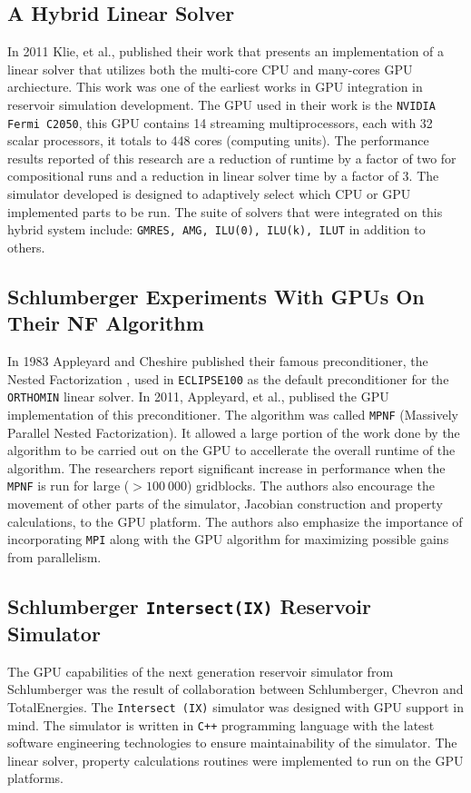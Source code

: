 \documentclass[barcolor=BrickRed,nocopyright,nolists]{asmejour}
\begin{document}
\subsection{A Hybrid Linear Solver}
In 2011 Klie, et al.\cite{spe141265}, published their work that presents an implementation of a linear solver that utilizes both the multi-core CPU and many-cores GPU archiecture. This work was one of the earliest works in GPU integration in reservoir simulation development. The GPU used in their work is the \texttt{NVIDIA Fermi C2050}, this GPU contains
14 streaming multiprocessors, each with 32 scalar processors, it totals to 448 cores (computing units). The performance results reported of this research are a reduction of runtime by a factor of two for compositional runs and a reduction in linear solver time by a factor of 3. The simulator developed is designed to adaptively select which CPU or GPU implemented
parts to be run. The suite of solvers that were integrated on this hybrid system include: \texttt{GMRES, AMG, ILU(0), ILU(k), ILUT} in addition to others.

\subsection{Schlumberger Experiments With GPUs On Their NF Algorithm}
In 1983 Appleyard and Cheshire\cite{spe12264} published their famous preconditioner, the Nested Factorization , used in \texttt{ECLIPSE100} as the default preconditioner for the \texttt{ORTHOMIN} linear solver. In 2011, Appleyard, et al., publised the GPU implementation of this preconditioner\cite{spe141402}. The algorithm was called 
\texttt{MPNF} (Massively Parallel Nested Factorization). It allowed a large portion of the work done by the algorithm to be carried out on the GPU to accellerate the overall runtime of the algorithm. The researchers report significant increase in performance when the \texttt{MPNF} is run for large ($>100 \ 000$) gridblocks. The authors
also encourage the movement of other parts of the simulator, Jacobian construction and property calculations, to the GPU platform. The authors also emphasize the importance of incorporating \texttt{MPI} along with the GPU algorithm for maximizing possible gains from parallelism.

\subsection{Schlumberger \texttt{Intersect(IX)} Reservoir Simulator}
The GPU capabilities of the next generation reservoir simulator from Schlumberger was the result of collaboration between Schlumberger, Chevron and TotalEnergies. The \texttt{Intersect (IX)} simulator was designed with GPU support in mind. The simulator is written in \texttt{C++} programming language with the latest software engineering technologies to ensure 
maintainability of the simulator. The linear solver, property calculations routines were implemented to run on the GPU platforms.
\end{document}
